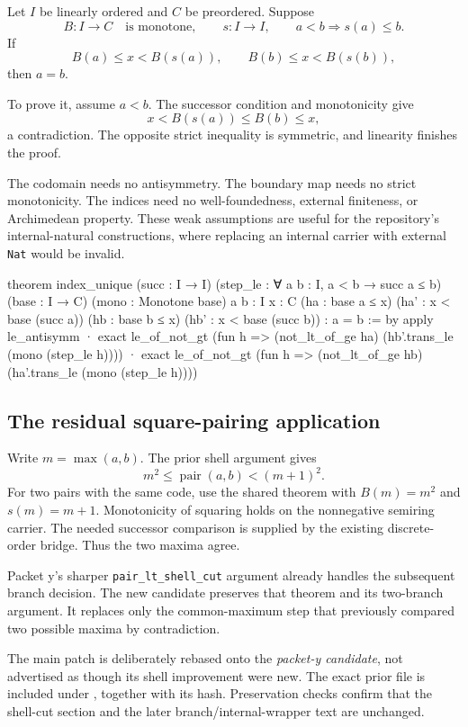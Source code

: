 \documentclass[11pt,letterpaper]{article}
\newcommand{\code}[1]{\texttt{\small #1}}
\begin{document}
Let $I$ be linearly ordered and $C$ be preordered. Suppose
\[
 B:I\to C\quad\text{is monotone},\qquad
 s:I\to I,\qquad a<b\Longrightarrow s(a)\le b.
\]
If
\[
 B(a)\le x<B(s(a)),\qquad B(b)\le x<B(s(b)),
\]
then $a=b$.

To prove it, assume $a<b$. The successor condition and monotonicity give
\[
 x<B(s(a))\le B(b)\le x,
\]
a contradiction. The opposite strict inequality is symmetric, and linearity finishes the proof.

The codomain needs no antisymmetry. The boundary map needs no strict monotonicity. The indices need no well-foundedness, external finiteness, or Archimedean property. These weak assumptions are useful for the repository's internal-natural constructions, where replacing an internal carrier with external \code{Nat} would be invalid.

\begin{Lean}
theorem index_unique (succ : I → I)
    (step_le : ∀ {a b : I}, a < b → succ a ≤ b)
    (base : I → C) (mono : Monotone base)
    {a b : I} {x : C}
    (ha : base a ≤ x) (ha' : x < base (succ a))
    (hb : base b ≤ x) (hb' : x < base (succ b)) : a = b := by
  apply le_antisymm
  · exact le_of_not_gt (fun h =>
      (not_lt_of_ge ha) (hb'.trans_le (mono (step_le h))))
  · exact le_of_not_gt (fun h =>
      (not_lt_of_ge hb) (ha'.trans_le (mono (step_le h))))
\end{Lean}

\subsection{The residual square-pairing application}

Write $m=\max(a,b)$. The prior shell argument gives
\[
 m^2\le \operatorname{pair}(a,b)<(m+1)^2.
\]
For two pairs with the same code, use the shared theorem with $B(m)=m^2$ and $s(m)=m+1$. Monotonicity of squaring holds on the nonnegative semiring carrier. The needed successor comparison is supplied by the existing discrete-order bridge. Thus the two maxima agree.

Packet y's sharper \code{pair\_lt\_shell\_cut} argument already handles the subsequent branch decision. The new candidate preserves that theorem and its two-branch argument. It replaces only the common-maximum step that previously compared two possible maxima by contradiction.

The main patch is deliberately rebased onto the \emph{packet-y candidate}, not advertised as though its shell improvement were new. The exact prior file is included under , together with its hash. Preservation checks confirm that the shell-cut section and the later branch/internal-wrapper text are unchanged.
\end{document}
